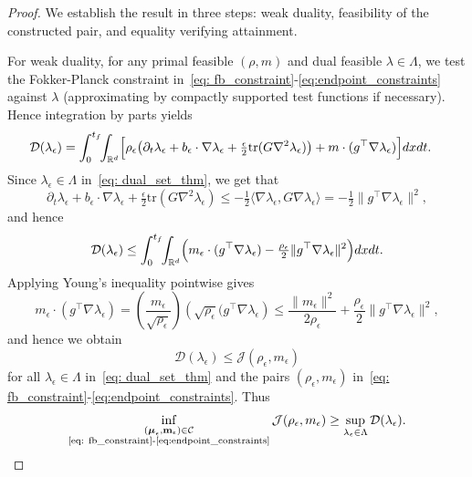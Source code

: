 \documentclass{amsart}
\numberwithin{equation}{section}
\newcommand{\R}{\mathbb{R}}
\begin{document}
\begin{proof}
We establish the result in three steps: weak duality, feasibility of the constructed pair, and equality verifying attainment.

For weak duality, for any primal feasible $(\rho,m)$ and dual feasible $\lambda\in\Lambda$, we test the Fokker-Planck constraint in~\eqref{eq: fb_constraint}-\eqref{eq:endpoint_constraints} against $\lambda$ (approximating by compactly supported test functions if necessary). Hence integration by parts yields
\begin{align*}
\mathcal D(\lambda_{\epsilon})
&=\int_0^{t_f}\!\!\int_{\R^d}
\Bigl[\rho_{\epsilon}\bigl(\partial_t\lambda_{\epsilon}+b_\epsilon\cdot\nabla\lambda_{\epsilon}
+\tfrac{\epsilon}{2}\mathrm{tr}(G\nabla^2\lambda_{\epsilon})\bigr)
+ m\cdot(g^\top\nabla\lambda_{\epsilon})\Bigr] dx dt.
\end{align*}
Since $\lambda_{\epsilon}\in\Lambda$ in~\eqref{eq: dual_set_thm}, we get that
\[
\partial_t\lambda_{\epsilon}+b_\epsilon\cdot\nabla\lambda_{\epsilon}
+\tfrac{\epsilon}{2}\mathrm{tr}(G\nabla^2\lambda_{\epsilon})
\le -\tfrac12\langle\nabla\lambda_{\epsilon},G\nabla\lambda_{\epsilon}\rangle
=-\tfrac12\|g^\top\nabla\lambda_{\epsilon}\|^2,
\]
and hence
\[
\mathcal D(\lambda_{\epsilon})\le \int_0^{t_f}\!\!\int_{\R^d}
\Bigl(m_{\epsilon}\cdot(g^\top\nabla\lambda_{\epsilon})-\tfrac{\rho_{\epsilon}}{2}\|g^\top\nabla\lambda_{\epsilon}\|^2\Bigr) dx dt.
\]
Applying Young's inequality pointwise gives
\begin{equation}\label{eq: Young's inequality}
m_{\epsilon}\cdot(g^\top\nabla\lambda_{\epsilon})=\left(\frac{m_{\epsilon}}{\sqrt{\rho_{\epsilon}}}\right)\left(\sqrt{\rho_{\epsilon}}(g^\top\nabla\lambda_{\epsilon}\right)
\le \frac{\|m_{\epsilon}\|^2}{2\rho_{\epsilon}}+\frac{\rho_{\epsilon}}{2}\|g^\top\nabla\lambda_{\epsilon}\|^2,
\end{equation}
and hence we obtain 
\[
\mathcal D(\lambda_{\epsilon})\le \mathcal J(\rho_{\epsilon},m_{\epsilon})
\]
for all $\lambda_{\epsilon}\in\Lambda$ in~\eqref{eq: dual_set_thm} and the pairs $(\rho_{\epsilon},m_{\epsilon})$ in~\eqref{eq: fb_constraint}-\eqref{eq:endpoint_constraints}. Thus 
\begin{equation}\label{eq: weak duality} 
\inf_{\substack{(\boldsymbol\mu_{\epsilon}, \mathbf m_{\epsilon})\in \mathcal C \\ \text{\eqref{eq: fb_constraint}-\eqref{eq:endpoint_constraints}}}} 
\mathcal{J}(\rho_{\epsilon},m_{\epsilon}) \geq \sup_{\lambda_{\epsilon}\in\Lambda}\mathcal D(\lambda_{\epsilon}).

\end{equation}
\end{proof}
\end{document}
